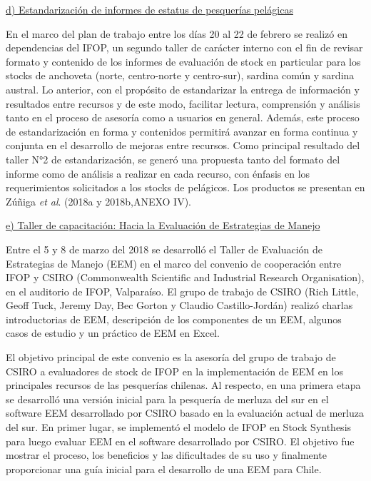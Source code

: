 \documentclass[
  spanish,
]{article}
\begin{document}
\vspace{0.3cm}

\underline{d) Estandarización de informes de estatus de pesquerías pelágicas}

En el marco del plan de trabajo entre los días 20 al 22 de febrero se
realizó en dependencias del IFOP, un segundo taller de carácter interno
con el fin de revisar formato y contenido de los informes de evaluación
de stock en particular para los stocks de anchoveta (norte, centro-norte
y centro-sur), sardina común y sardina austral. Lo anterior, con el
propósito de estandarizar la entrega de información y resultados entre
recursos y de este modo, facilitar lectura, comprensión y análisis tanto
en el proceso de asesoría como a usuarios en general. Además, este
proceso de estandarización en forma y contenidos permitirá avanzar en
forma continua y conjunta en el desarrollo de mejoras entre recursos.
Como principal resultado del taller N°2 de estandarización, se generó
una propuesta tanto del formato del informe como de análisis a realizar
en cada recurso, con énfasis en los requerimientos solicitados a los
stocks de pelágicos. Los productos se presentan en Zúñiga \emph{et al}.
(2018a y 2018b,ANEXO IV).

\vspace{0.3cm}

\underline{e) Taller de capacitación: Hacia la Evaluación de Estrategias de Manejo}

Entre el 5 y 8 de marzo del 2018 se desarrolló el Taller de Evaluación
de Estrategias de Manejo (EEM) en el marco del convenio de cooperación
entre IFOP y CSIRO (Commonwealth Scientific and Industrial Research
Organisation), en el auditorio de IFOP, Valparaíso. El grupo de trabajo
de CSIRO (Rich Little, Geoff Tuck, Jeremy Day, Bec Gorton y Claudio
Castillo-Jordán) realizó charlas introductorias de EEM, descripción de
los componentes de un EEM, algunos casos de estudio y un práctico de EEM
en Excel.

El objetivo principal de este convenio es la asesoría del grupo de
trabajo de CSIRO a evaluadores de stock de IFOP en la implementación de
EEM en los principales recursos de las pesquerías chilenas. Al respecto,
en una primera etapa se desarrolló una versión inicial para la pesquería
de merluza del sur en el software EEM desarrollado por CSIRO basado en
la evaluación actual de merluza del sur. En primer lugar, se implementó
el modelo de IFOP en Stock Synthesis para luego evaluar EEM en el
software desarrollado por CSIRO. El objetivo fue mostrar el proceso, los
beneficios y las dificultades de su uso y finalmente proporcionar una
guía inicial para el desarrollo de una EEM para Chile.
\end{document}
